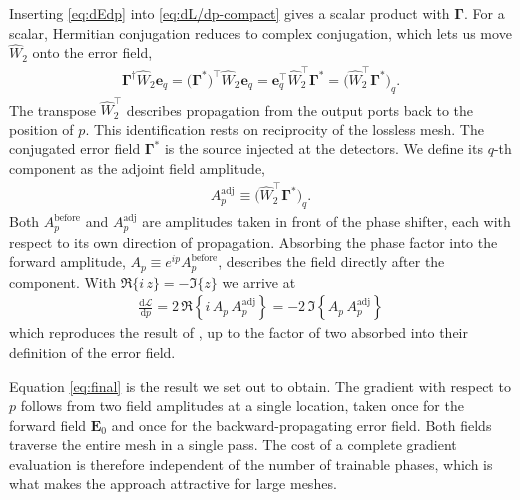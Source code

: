 \begin{appendices}
Inserting \eqref{eq:dEdp} into \eqref{eq:dL/dp-compact} gives a scalar product with $\boldsymbol{\Gamma}$. 
For a scalar, Hermitian conjugation reduces to complex conjugation, which lets us move $\hat{W}_2$ onto the error field,
\begin{align*}
    \boldsymbol{\Gamma}^{\dagger}\hat{W}_{2}\mathbf{e}_{q}
    = \bigl(\boldsymbol{\Gamma}^{*}\bigr)^{\top}\hat{W}_{2}\mathbf{e}_{q}
    = \mathbf{e}_{q}^{\top}\hat{W}_{2}^{\top}\boldsymbol{\Gamma}^{*}
    = \bigl(\hat{W}_{2}^{\top}\boldsymbol{\Gamma}^{*}\bigr)_{q}.
\end{align*}
The transpose $\hat{W}_2^{\top}$ describes propagation from the output ports back to the position of $p$. 
This identification rests on reciprocity of the lossless mesh. 
The conjugated error field $\mathbf{\Gamma}^{*}$ is the source injected at the detectors. 
We define its $q$-th component as the adjoint field amplitude,
\begin{align*}
    A_p^{\mathrm{adj}} \equiv
    \bigl(\hat{W}_{2}^{\top}\mathbf{\Gamma}^{*}\bigr)_{q}.
\end{align*}
Both $A_p^{\text{before}}$ and $A_p^{\mathrm{adj}}$ are amplitudes taken in front of the phase shifter, each with respect to its own direction of propagation. 
Absorbing the phase factor into the forward amplitude, $A_p \equiv e^{ip}A_p^{\text{before}}$, describes the field directly after the component. 
With $\Re\{i\,z\}=-\Im\{z\}$ we arrive at 
\begin{align}
    \frac{\mathrm{d}\mathcal{L}}{\mathrm{d}p}
    = 2\,\Re\left\{ i\,A_p\,A_p^{\mathrm{adj}} \right\}
    = -2\,\Im\left\{ A_p\,A_p^{\mathrm{adj}} \right\}
    \label{eq:final}
\end{align}
which reproduces the result of \cite{hughesTrainingPhotonicNeural2018}, up to
the factor of two absorbed into their definition of the error field.

Equation \eqref{eq:final} is the result we set out to obtain. 
The gradient with respect to $p$ follows from two field amplitudes at a single location, taken once for the forward field $\mathbf{E}_0$ and once for the backward-propagating error field. 
Both fields traverse the entire mesh in a single pass. 
The cost of a complete gradient evaluation is therefore independent of the number of trainable phases, which is what makes the approach attractive for large meshes.
 

\end{appendices}
